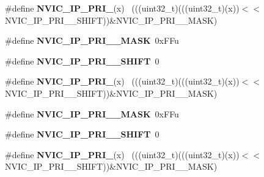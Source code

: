 \begin{DoxyCompactItemize}
\item 
\hypertarget{group___n_v_i_c___register___masks_ga651fa23273bce3728f9c03f6095c000e}{}\#define {\bfseries N\+V\+I\+C\+\_\+\+I\+P\+\_\+\+P\+R\+I\+\_}(x)                                            ~(((uint32\+\_\+t)(((uint32\+\_\+t)(x))$<$$<$N\+V\+I\+C\+\_\+\+I\+P\+\_\+\+P\+R\+I\+\_\+\_\+\+S\+H\+I\+F\+T))\&N\+V\+I\+C\+\_\+\+I\+P\+\_\+\+P\+R\+I\+\_\+\_\+\+M\+A\+S\+K)\label{group___n_v_i_c___register___masks_ga651fa23273bce3728f9c03f6095c000e}

\item 
\hypertarget{group___n_v_i_c___register___masks_ga98b67c16495a2086981414f7be52c196}{}\#define {\bfseries N\+V\+I\+C\+\_\+\+I\+P\+\_\+\+P\+R\+I\+\_\+\_\+\+M\+A\+S\+K}~0x\+F\+Fu\label{group___n_v_i_c___register___masks_ga98b67c16495a2086981414f7be52c196}

\item 
\hypertarget{group___n_v_i_c___register___masks_ga5ec9fa6126f0d654ba4ca6268f010360}{}\#define {\bfseries N\+V\+I\+C\+\_\+\+I\+P\+\_\+\+P\+R\+I\+\_\+\_\+\+S\+H\+I\+F\+T}~0\label{group___n_v_i_c___register___masks_ga5ec9fa6126f0d654ba4ca6268f010360}

\item 
\hypertarget{group___n_v_i_c___register___masks_ga1059be0ca0091f9bc02c6c1c916eae5f}{}\#define {\bfseries N\+V\+I\+C\+\_\+\+I\+P\+\_\+\+P\+R\+I\+\_}(x)                                            ~(((uint32\+\_\+t)(((uint32\+\_\+t)(x))$<$$<$N\+V\+I\+C\+\_\+\+I\+P\+\_\+\+P\+R\+I\+\_\+\_\+\+S\+H\+I\+F\+T))\&N\+V\+I\+C\+\_\+\+I\+P\+\_\+\+P\+R\+I\+\_\+\_\+\+M\+A\+S\+K)\label{group___n_v_i_c___register___masks_ga1059be0ca0091f9bc02c6c1c916eae5f}

\item 
\hypertarget{group___n_v_i_c___register___masks_gad9d53a724bb3444439b236ad42d98266}{}\#define {\bfseries N\+V\+I\+C\+\_\+\+I\+P\+\_\+\+P\+R\+I\+\_\+\_\+\+M\+A\+S\+K}~0x\+F\+Fu\label{group___n_v_i_c___register___masks_gad9d53a724bb3444439b236ad42d98266}

\item 
\hypertarget{group___n_v_i_c___register___masks_ga06c5d2803f46b7145c7369ad34ce864b}{}\#define {\bfseries N\+V\+I\+C\+\_\+\+I\+P\+\_\+\+P\+R\+I\+\_\+\_\+\+S\+H\+I\+F\+T}~0\label{group___n_v_i_c___register___masks_ga06c5d2803f46b7145c7369ad34ce864b}

\item 
\hypertarget{group___n_v_i_c___register___masks_ga2b7f135f6f5ab3e8557131145b390786}{}\#define {\bfseries N\+V\+I\+C\+\_\+\+I\+P\+\_\+\+P\+R\+I\+\_}(x)                                              ~(((uint32\+\_\+t)(((uint32\+\_\+t)(x))$<$$<$N\+V\+I\+C\+\_\+\+I\+P\+\_\+\+P\+R\+I\+\_\+\_\+\+S\+H\+I\+F\+T))\&N\+V\+I\+C\+\_\+\+I\+P\+\_\+\+P\+R\+I\+\_\+\_\+\+M\+A\+S\+K)\label{group___n_v_i_c___register___masks_ga2b7f135f6f5ab3e8557131145b390786}


\end{DoxyCompactItemize}
